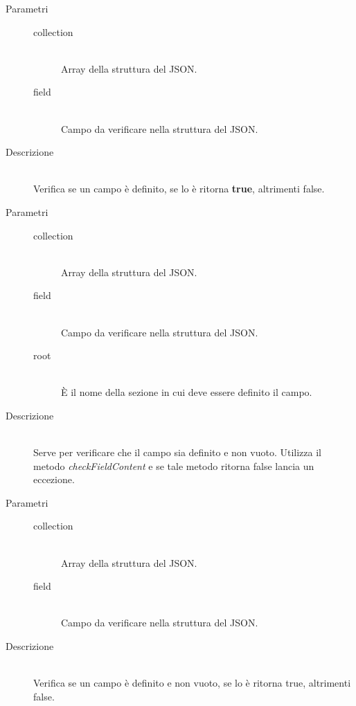 \begin{description}
\begin{mldescription}
\begin{description}
  \end{description}
  \hfill 
 \begin{description}
     		\item[Parametri] \hfill
     			\begin{description}
     				\item[collection] \hfill \\
     			     Array della struttura del JSON.
     			    \item[field] \hfill \\
     			     Campo da verificare nella struttura del JSON.
     			\end{description}
     		\item[Descrizione] \hfill \\
     		Verifica se un campo è definito, se lo è ritorna \textbf{true}, altrimenti false.
  \end{description}
  \hfill
 \begin{description}
     		\item[Parametri] \hfill
     			\begin{description}
     				\item[collection] \hfill \\
     				 Array della struttura del JSON.
     				\item[field] \hfill \\
     				 Campo da verificare nella struttura del JSON.
     				\item[root] \hfill \\
     				 \`{E} il nome della sezione in cui deve essere definito il campo.
     			\end{description}
     		\item[Descrizione] \hfill \\
     		Serve per verificare che il campo sia definito e non vuoto. Utilizza il metodo \textit{checkFieldContent} e se tale metodo ritorna false lancia un eccezione.
  \end{description}
  \hfill 
 \begin{description}
     		\item[Parametri] \hfill
     			\begin{description}
     				\item[collection] \hfill \\
     				 Array della struttura del JSON.
       			    \item[field] \hfill \\
       			     Campo da verificare nella struttura del JSON.
     			\end{description}
     		\item[Descrizione] \hfill \\
     		Verifica se un campo è definito e non vuoto, se lo è ritorna true, altrimenti false.
  \end{description}
  

\end{mldescription}
\end{description}
